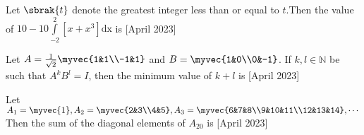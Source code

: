 \item Let $\sbrak{t}$ denote the greatest integer less than or equal to $t$.Then the value of $10-10\int\limits_{-2}^{2}{[x+x^3]}\text{dx}$ is \underline{\hspace{1cm}} \hfill{[April 2023]}\\

\item Let $A=\frac{1}{\sqrt{2}}\myvec{1&1\\-1&1}$ and $B=\myvec{1&0\\0&-1}$. If $k, l \in \mathbb N$ be such that $A^{k}B^{l}=I$, then the minimum value of $k+l$ is \underline{\hspace{1cm}} \hfill{[April 2023]}\\

\item Let $A_1=\myvec{1}, A_2=\myvec{2&3\\4&5},A_3=\myvec{6&7&8\\9&10&11\\12&13&14},\cdots$ Then the sum of the diagonal elements of $A_{20}$ is \underline{\hspace{1cm}} \hfill{[April 2023]}\\

